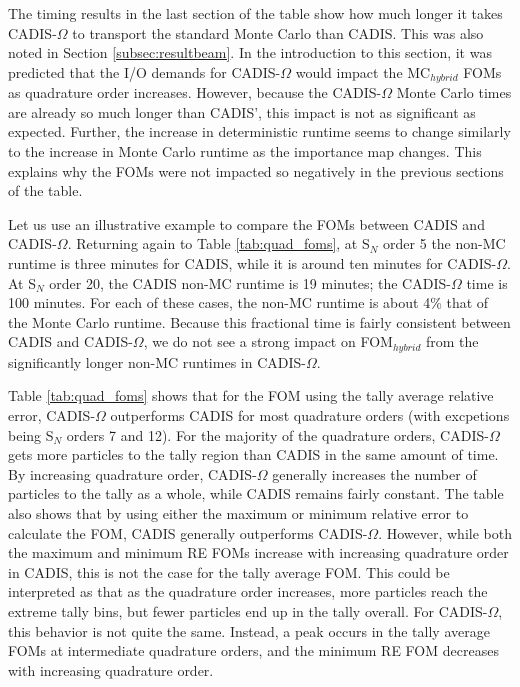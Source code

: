 The timing results in the last section of the table show how much longer it
takes CADIS-$\Omega$ to transport the standard Monte Carlo than CADIS. This was
also noted in Section \ref{subsec:resultbeam}. In the
introduction to this section, it was predicted that the I/O demands for
CADIS-$\Omega$ would impact the MC$_{hybrid}$ FOMs as quadrature order
increases. However, because the CADIS-$\Omega$ Monte Carlo times are already so
much longer than CADIS', this impact is not as significant as expected. Further,
the increase in deterministic runtime seems to change similarly to the increase
in Monte Carlo runtime as the importance map changes. This explains why the FOMs
were not impacted so negatively in the previous sections of the table.

Let us use an illustrative example to compare the FOMs between CADIS and
CADIS-$\Omega$. Returning again to Table
\ref{tab:quad_foms}, at S$_N$ order 5 the non-MC runtime is three minutes for
CADIS, while it is around ten minutes for CADIS-$\Omega$. At S$_N$ order 20, the
CADIS non-MC runtime is 19 minutes; the CADIS-$\Omega$ time is 100 minutes. For
each of these cases, the non-MC runtime is about 4\% that of the Monte Carlo runtime.
Because this fractional time is fairly consistent between CADIS and
CADIS-$\Omega$, we do not see a strong impact on FOM$_{hybrid}$ from the
significantly longer non-MC runtimes in CADIS-$\Omega$.

Table \ref{tab:quad_foms} shows that for the FOM using the tally average relative error,
CADIS-$\Omega$ outperforms CADIS for most quadrature orders (with excpetions
being S$_N$ orders 7 and 12). For the majority of the quadrature orders,
CADIS-$\Omega$ gets more particles to the tally region than CADIS in the same
amount of time. By increasing
quadrature order, CADIS-$\Omega$ generally increases the number of particles to
the tally as a whole, while CADIS remains fairly constant. The table
also shows that by using either the maximum or minimum relative error to
calculate the FOM, CADIS generally outperforms CADIS-$\Omega$. However, while
both the maximum and minimum RE FOMs increase with increasing quadrature order
in CADIS, this is not the case for the tally average FOM. This could be
interpreted as that as the quadrature order increases, more particles reach the extreme
tally bins, but fewer particles end up in the tally overall. For CADIS-$\Omega$,
this behavior is not quite the same. Instead, a peak occurs in the tally
average FOMs at intermediate quadrature orders, and the minimum RE FOM decreases
with increasing quadrature order.

